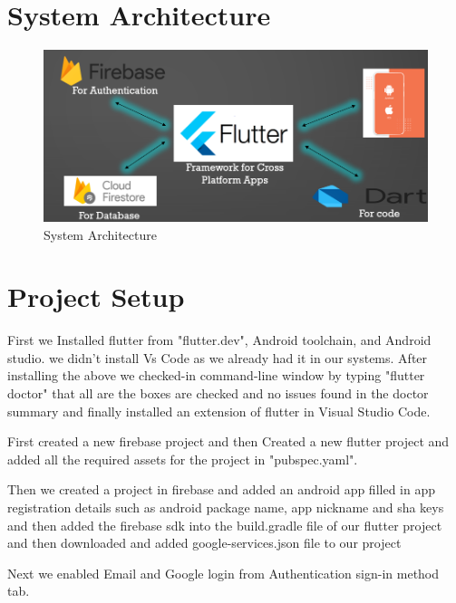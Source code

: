 \section{System Architecture}
\begin{figure}[!htb]
    \centering
    \includegraphics[scale=0.70]{img/systemArchitecture.PNG}
    \caption{System Architecture}
    \label{fig:System Architecture}
\end{figure}

\section{Project Setup}
First we Installed flutter from "flutter.dev", Android toolchain, and Android studio. we didn't install Vs Code as we already had it in our systems. After installing the above we checked-in command-line window by typing "flutter doctor" that all are the boxes are checked and no issues found in the doctor summary and finally installed an extension of flutter in Visual Studio Code. 

First created a new firebase project and then Created a new flutter project and added all the required assets for the project in "pubspec.yaml". 

Then we created a project in firebase and added an android app filled in app registration details such as android package name, app nickname and sha keys and then added the firebase sdk into the build.gradle file of our flutter project and then downloaded and added google-services.json file to our project 

Next we enabled Email and Google login from Authentication sign-in method tab.
